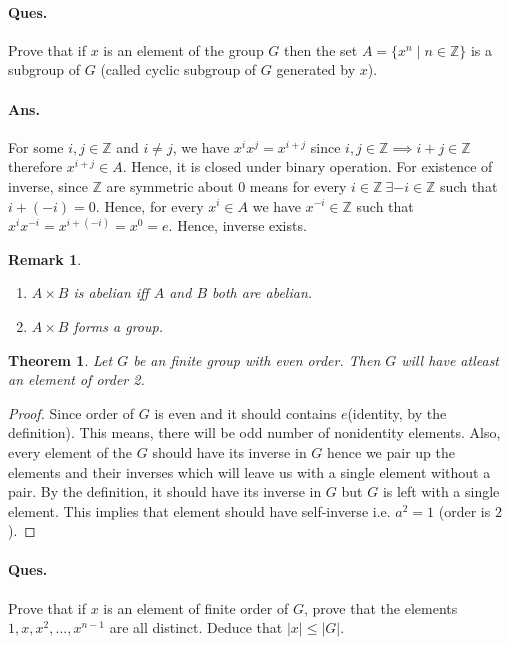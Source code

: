 \documentclass[12pt]{report}
\newtheorem{thm}{Theorem}
\newtheorem*{rem}{Remark}
\begin{document}
\paragraph*{Ques. } Prove that if $x$ is an element of the group $G$ then the set $A = \{x^n \mid n \in \mathbb{Z}\}$ is a subgroup of $G$ (called cyclic subgroup of $G$ generated by $x$).
\paragraph*{Ans. } For some $i,j \in \mathbb{Z}$ and $i \neq j$, we have $x^i x^j = x^{i+j}$ since $i,j \in \mathbb{Z} \implies i+j \in \mathbb{Z}$ therefore $x^{i+j} \in A$. Hence, it is closed under binary operation. 
For existence of inverse, since $\mathbb{Z}$ are symmetric about $0$ means for every $i \in \mathbb{Z}~\exists -i \in \mathbb{Z}$ such that $i + (-i) = 0$. Hence, for every $x^i \in A$ we have $x^{-i} \in \mathbb{Z}$ such that $x^i x^{-i} = x^{i+(-i)} = x^0 = e$. Hence, inverse exists.
\begin{rem}
    \begin{enumerate}
        \item $A\times B$ is abelian iff $A$ and $B$ both are abelian.
        \item $A\times B$ forms a group.
    \end{enumerate}
\end{rem}
\begin{thm}
    Let $G$ be an finite group with even order. Then $G$ will have atleast an element of order 2.
\end{thm}
\begin{proof}
    Since order of $G$ is even and it should contains $e$(identity, by the definition). This means, there will be odd number of nonidentity elements. Also, every element of the $G$ should have its inverse in $G$ hence we pair up the elements and their inverses which will leave us with a single element without a pair. By the definition, it should have its inverse in $G$ but $G$ is left with a single element. This implies that element should have self-inverse i.e. $a^2 = 1$ (order is $2$).
\end{proof}
\paragraph*{Ques. }Prove that if $x$ is an element of finite order of $G$, prove that the elements $1, x, x^2, \dots, x^{n-1}$ are all distinct. Deduce that $|x| \leq |G|$.
\end{document}
